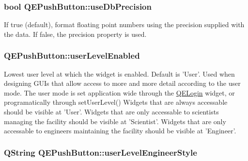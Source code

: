\hypertarget{classQEPushButton_a54eac8b0529c52c2e96fbbdd0bb78f33}{
\subsubsection[{useDbPrecision}]{\setlength{\rightskip}{0pt plus 5cm}bool QEPushButton::useDbPrecision}}
\label{classQEPushButton_a54eac8b0529c52c2e96fbbdd0bb78f33}
If true (default), format floating point numbers using the precision supplied with the data. If false, the precision property is used. \hypertarget{classQEPushButton_a6a2efa62cba908ac5647df6c6fd0a381}{
\subsubsection[{userLevelEnabled}]{ QEPushButton::userLevelEnabled}}
\label{classQEPushButton_a6a2efa62cba908ac5647df6c6fd0a381}
Lowest user level at which the widget is enabled. Default is 'User'. Used when designing GUIs that allow access to more and more detail according to the user mode. The user mode is set application wide through the \hyperlink{classQELogin}{QELogin} widget, or programatically through setUserLevel() Widgets that are always accessable should be visible at 'User'. Widgets that are only accessable to scientists managing the facility should be visible at 'Scientist'. Widgets that are only accessable to engineers maintaining the facility should be visible at 'Engineer'. \hypertarget{classQEPushButton_a2397eaaa00d562429bd84bf5e04ade53}{
\subsubsection[{userLevelEngineerStyle}]{\setlength{\rightskip}{0pt plus 5cm}QString QEPushButton::userLevelEngineerStyle}}
\label{classQEPushButton_a2397eaaa00d562429bd84bf5e04ade53}
